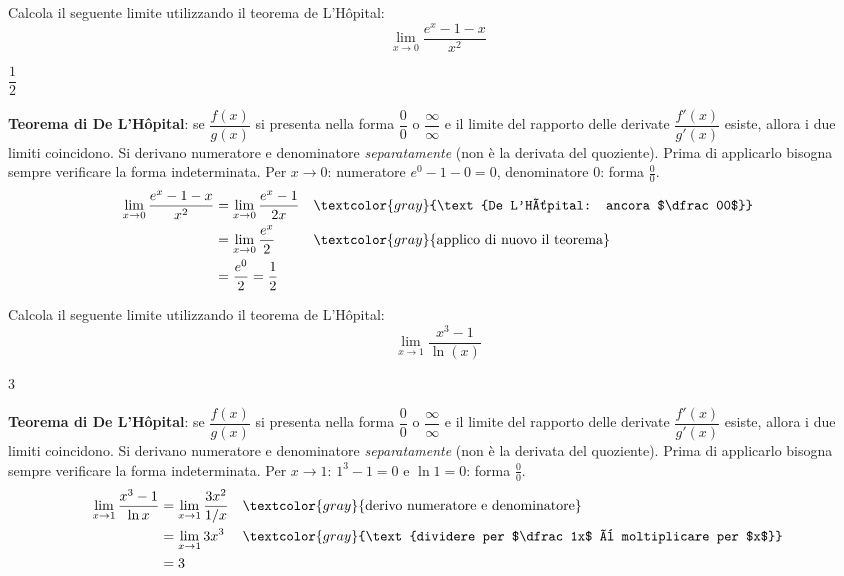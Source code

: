 \begin{question}[ID=1.1, subtitle={De L'Hôpital: $\lim_{x\to0}(e^x-1-x)/x^2$}, tags={de l'hospital, limiti}, difficulty=facile]
Calcola il seguente limite utilizzando il teorema de L'Hôpital:
\[
\lim_{x \to 0} \frac{e^x - 1 - x}{x^2}
\]
\begin{solution}
$\dfrac12$
\end{solution}
\begin{explanation}
\textbf{Teorema di De L'Hôpital}: se $\dfrac{f(x)}{g(x)}$ si presenta nella forma $\dfrac00$ o $\dfrac\infty\infty$ e il limite del rapporto delle derivate $\dfrac{f'(x)}{g'(x)}$ esiste, allora i due limiti coincidono. Si derivano numeratore e denominatore \emph{separatamente} (non è la derivata del quoziente). Prima di applicarlo bisogna sempre verificare la forma indeterminata.
Per $x\to0$: numeratore $e^0-1-0=0$, denominatore $0$: forma $\tfrac00$.
\[\begin{aligned}
\lim_{x\to0}\dfrac{e^x-1-x}{x^2} &= \lim_{x\to0}\dfrac{e^x-1}{2x} && \textcolor{gray}{\text{De L'Hôpital: ancora $\dfrac00$}}\\
&= \lim_{x\to0}\dfrac{e^x}{2} && \textcolor{gray}{\text{applico di nuovo il teorema}}\\
&= \dfrac{e^0}{2}=\dfrac12
\end{aligned}\]
\end{explanation}
\end{question}


\begin{question}[ID=1.2, subtitle={De L'Hôpital: $\lim_{x\to1}(x^3-1)/\ln x$}, tags={de l'hospital, limiti}, difficulty=facile]
Calcola il seguente limite utilizzando il teorema de L'Hôpital:
\[
\lim_{x \to 1} \frac{x^3 - 1}{\ln(x)}
\]
\begin{solution}
$3$
\end{solution}
\begin{explanation}
\textbf{Teorema di De L'Hôpital}: se $\dfrac{f(x)}{g(x)}$ si presenta nella forma $\dfrac00$ o $\dfrac\infty\infty$ e il limite del rapporto delle derivate $\dfrac{f'(x)}{g'(x)}$ esiste, allora i due limiti coincidono. Si derivano numeratore e denominatore \emph{separatamente} (non è la derivata del quoziente). Prima di applicarlo bisogna sempre verificare la forma indeterminata.
Per $x\to1$: $1^3-1=0$ e $\ln1=0$: forma $\tfrac00$.
\[\begin{aligned}
\lim_{x\to1}\dfrac{x^3-1}{\ln x} &= \lim_{x\to1}\dfrac{3x^2}{1/x} && \textcolor{gray}{\text{derivo numeratore e denominatore}}\\
&= \lim_{x\to1}3x^3 && \textcolor{gray}{\text{dividere per $\dfrac1x$ è moltiplicare per $x$}}\\
&= 3
\end{aligned}\]
\end{explanation}
\end{question}

